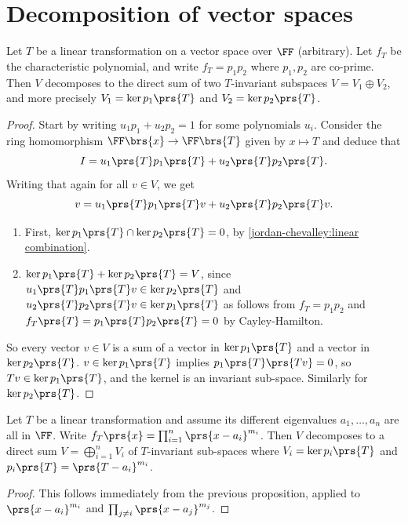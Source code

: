 \documentclass[10pt,a4paper,twoside,openany,hidelinks]{book}
\begin{document}
\section{Decomposition of vector spaces}
\begin{proposition}
Let $T$ be a linear transformation on a vector space over $\FF$ (arbitrary).
Let $f_T$ be the characteristic polynomial, and write $f_T = p_1 p_2$ where $p_1,p_2$ are co-prime.
Then $V$ decomposes to the direct sum of two $T$-invariant subspaces
$V = V_1 \oplus V_2$, and more precisely $V_1 = \ker p_1\prs{T}$ and $V_2 = \ker p_2\prs{T}$.
\end{proposition}
\begin{proof}
Start by writing $u_1p_1 + u_2p_2 = 1$ for some polynomials $u_i$. Consider the ring homomorphism $\FF\brs{x} \to \FF\brs{T}$ given by $x \mapsto T$ and deduce that \[I = u_1\prs{T}p_1\prs{T} + u_2\prs{T}p_2\prs{T}\text{.}\]
Writing that again for all $v \in V$, we get
\begin{equation} \label{jordan-chevalley:linear combination}
v = u_1\prs{T} p_1\prs{T} v + u_2\prs{T} p_2\prs{T} v \text{.}
\end{equation}
\begin{enumerate}[label = (\roman*)]
\item First, $\ker p_1\prs{T} \cap \ker p_2\prs{T} = 0$, by \eqref{jordan-chevalley:linear combination}.
\item $\ker p_1\prs{T} + \ker p_2\prs{T} = V$, since $u_1\prs{T} p_1\prs{T}v \in \ker p_2\prs{T}$ and $u_2\prs{T} p_2\prs{T}v \in \ker p_1\prs{T}$ as follows from $f_T = p_1 p_2$ and $f_T\prs{T} = p_1\prs{T} p_2\prs{T} = 0$ by Cayley-Hamilton.
\end{enumerate}
So every vector $v \in V$ is a sum of a vector in $\ker p_1 \prs{T}$ and a vector in $\ker p_2 \prs{T}$.
$v \in \ker p_1\prs{T}$ implies $p_1\prs{T}\prs{Tv} = 0$, so $Tv \in \ker p_1\prs{T}$, and the kernel is an invariant sub-space. Similarly for $\ker p_2\prs{T}$.
\end{proof}
\begin{proposition}
Let $T$ be a linear transformation and assume its different eigenvalues
$a_1, \ldots, a_n$ are all in $\FF$. Write $f_T\prs{x} = \prod_{i=1}^n \prs{x-a_i}^{m_i}$. Then $V$ decomposes to a direct sum $V = \bigoplus_{i=1}^n V_i$ of $T$-invariant sub-spaces where $V_i = \ker p_i\prs{T}$ and $p_i\prs{T} = \prs{T-a_i}^{m_i}$.
\end{proposition}
\begin{proof}
This follows immediately from the previous proposition, applied to $\prs{x-a_i}^{m_i}$ and $\prod_{j\neq i}\prs{x-a_j}^{m_j}$.
\end{proof}
\end{document}
